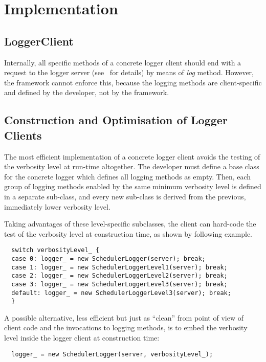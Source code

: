 \documentclass[a4paper,twoside]{tce}
\begin{document}
\section{Implementation}

\subsection{LoggerClient}
\label{ssec:LoggerClient-imp}

Internally, all specific methods of a concrete logger client should end with
a request to the logger server (see~\cite{ToolkitDesign} for details) by
means of \emph{log} method. However, the framework cannot enforce this,
because the logging methods are client-specific and defined by the
developer, not by the framework.

\subsection{Construction and Optimisation of Logger Clients}
\label{ssec:construction-imp}

The most efficient implementation of a concrete logger client avoids the
testing of the verbosity level at run-time altogether. The developer must
define a base class for the concrete logger which defines all logging
methods as empty. Then, each group of logging methods enabled by the same
minimum verbosity level is defined in a separate sub-class, and every new
sub-class is derived from the previous, immediately lower verbosity level.

Taking advantages of these level-specific subclasses, the client can
hard-code the test of the verbosity level at construction time, as shown by
following example.
\begin{verbatim}
  switch verbosityLevel_ {
  case 0: logger_ = new SchedulerLogger(server); break;
  case 1: logger_ = new SchedulerLoggerLevel1(server); break;
  case 2: logger_ = new SchedulerLoggerLevel2(server); break;
  case 3: logger_ = new SchedulerLoggerLevel3(server); break;
  default: logger_ = new SchedulerLoggerLevel3(server); break;
  }
\end{verbatim}

A possible alternative, less efficient but just as ``clean'' from point of
view of client code and the invocations to logging methods, is to embed the
verbosity level inside the logger client at construction time:
\begin{verbatim}
  logger_ = new SchedulerLogger(server, verbosityLevel_);
\end{verbatim}
\end{document}
